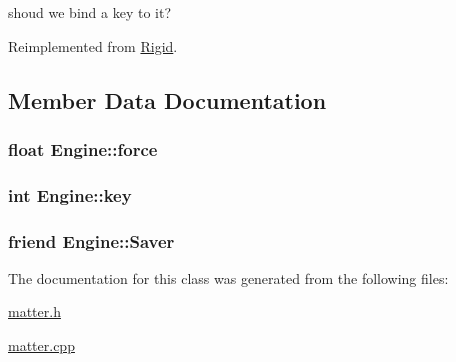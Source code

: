 shoud we bind a key to it? 



Reimplemented from \hyperlink{classRigid_a213d4ddd819ea799b7a29961b0d66f39}{Rigid}.



\subsection{Member Data Documentation}
\hypertarget{classEngine_aecd30a2b62a3c3d969f5d57892c1c131}{}
\subsubsection[{force}]{\setlength{\rightskip}{0pt plus 5cm}float Engine\+::force\hspace{0.3cm}{\ttfamily [private]}}\label{classEngine_aecd30a2b62a3c3d969f5d57892c1c131}
\hypertarget{classEngine_a134558741b3eb55f716b1ca177a095d6}{}
\subsubsection[{key}]{\setlength{\rightskip}{0pt plus 5cm}int Engine\+::key\hspace{0.3cm}{\ttfamily [private]}}\label{classEngine_a134558741b3eb55f716b1ca177a095d6}
\hypertarget{classEngine_aab36737a1fbe9e5ec464118849615d35}{}
\subsubsection[{Saver}]{\setlength{\rightskip}{0pt plus 5cm}friend Engine\+::\+Saver\hspace{0.3cm}{\ttfamily [private]}}\label{classEngine_aab36737a1fbe9e5ec464118849615d35}


The documentation for this class was generated from the following files\+:\begin{DoxyCompactItemize}
\item 
\hyperlink{matter_8h}{matter.\+h}\item 
\hyperlink{matter_8cpp}{matter.\+cpp}\end{DoxyCompactItemize}
